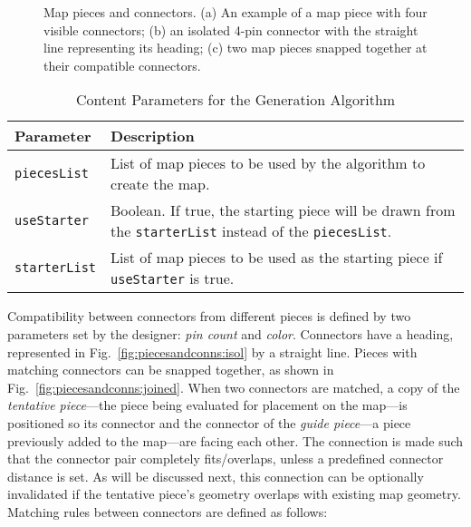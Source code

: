 \documentclass[journal]{IEEEtran}
\begin{document}
\begin{figure}
    \centering


    \caption{Map pieces and connectors.
        (a) An example of a map piece with four visible connectors;
        (b) an isolated 4-pin connector with the straight line representing its heading;
        (c) two map pieces snapped together at their compatible connectors.}

    \label{fig:piecesandconns}
\end{figure}

\begin{table}[!t]
\caption{Content Parameters for the Generation Algorithm}
\label{tab:contentparams}
\begin{tabular}{p{1.45cm}p{6.55cm}}
\toprule
Parameter & Description\\
\midrule
    \texttt{piecesList}
    & List of map pieces to be used by the algorithm to create the map.\\
    \texttt{useStarter}
    & Boolean. If true, the starting piece will be drawn from
      the \texttt{starterList} instead of the \texttt{piecesList}.\\
    \texttt{starterList}
    & List of map pieces to be used as the starting piece if \texttt{useStarter}
      is true.\\
\bottomrule
\end{tabular}
\end{table}

Compatibility between connectors from different pieces is defined by two
parameters set by the designer: \emph{pin count} and \emph{color}. Connectors
have a heading, represented in Fig.~\ref{fig:piecesandconns:isol} by a straight
line. Pieces with matching connectors can be snapped together, as shown in
Fig.~\ref{fig:piecesandconns:joined}. When two connectors are matched, a copy of
the \emph{tentative piece}---the piece being evaluated for placement on the
map---is positioned so its connector and the connector of the \emph{guide
piece}---a piece previously added to the map---are facing each other. The
connection is made such that the connector pair completely fits/overlaps, unless
a predefined connector distance is set.
As will be discussed next, this connection can be optionally invalidated if the
tentative piece's geometry overlaps with existing map geometry. Matching rules
between connectors are defined as follows:
\end{document}
